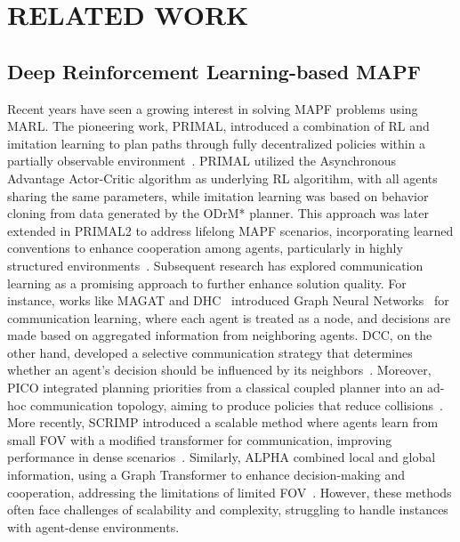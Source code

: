 \section{RELATED WORK}
\subsection{Deep Reinforcement Learning-based MAPF}

Recent years have seen a growing interest in solving MAPF problems using MARL. The pioneering work, PRIMAL, introduced a combination of RL and imitation learning to plan paths through fully decentralized policies within a partially observable environment~\cite{primal}. PRIMAL utilized the Asynchronous Advantage Actor-Critic algorithm as underlying RL algoritihm, with all agents sharing the same parameters, while imitation learning was based on behavior cloning from data generated by the ODrM* planner. This approach was later extended in PRIMAL2 to address lifelong MAPF scenarios, incorporating learned conventions to enhance cooperation among agents, particularly in highly structured environments~\cite{primal2}. Subsequent research has explored communication learning as a promising approach to further enhance solution quality. For instance, works like MAGAT and DHC~\cite{magat, dhc} introduced Graph Neural Networks~\cite{peng2024graphrare} for communication learning, where each agent is treated as a node, and decisions are made based on aggregated information from neighboring agents. DCC, on the other hand, developed a selective communication strategy that determines whether an agent's decision should be influenced by its neighbors~\cite{dcc}. Moreover, PICO integrated planning priorities from a classical coupled planner into an ad-hoc communication topology, aiming to produce policies that reduce collisions~\cite{pico}. More recently, SCRIMP introduced a scalable method where agents learn from small FOV with a modified transformer for communication, improving performance in dense scenarios~\cite{scrimp}. Similarly, ALPHA combined local and global information, using a Graph Transformer to enhance decision-making and cooperation, addressing the limitations of limited FOV~\cite{alpha}. However, these methods often face challenges of scalability and complexity, struggling to handle instances with agent-dense environments.

